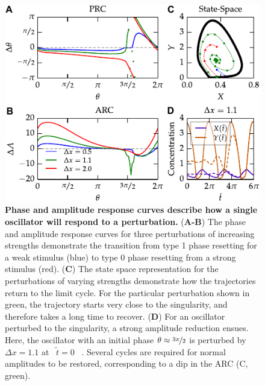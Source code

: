 \documentclass[11pt, letterpaper]{article}
\providecommand{\DIFadd}[1]{{\protect\color{blue}#1}} %
\providecommand{\DIFaddFL}[1]{\DIFadd{#1}} %
\providecommand{\DIFaddbeginFL}{} %
\providecommand{\DIFaddendFL}{} %
\begin{document}
\begin{figure}[tbp]
  \begin{center}
    \DIFaddbeginFL \includegraphics[width=.75\textwidth]{figures/figure_2.pdf}
    \DIFaddendFL \caption{
{\bfseries \DIFaddbeginFL \DIFaddFL{Phase }\DIFaddendFL and amplitude response curves \DIFaddbeginFL \DIFaddFL{describe }\DIFaddendFL how a single oscillator will respond to a perturbation.\DIFaddbeginFL }  \DIFaddendFL ({\bfseries A-B}) The phase and amplitude response curves for three perturbations of increasing strengths demonstrate the transition from type 1 phase resetting for a weak stimulus (blue) to type 0 phase resetting from a strong stimulus (red).
({\bfseries C}) The state space representation for the perturbations of varying strengths demonstrate how the trajectories return to the limit cycle.
For the particular perturbation shown in green, the trajectory starts very close to the singularity, and therefore takes a long time to recover.
({\bfseries D}) For an oscillator perturbed to the singularity, a strong amplitude reduction ensues.
Here, the oscillator with an initial phase $\theta \approx \nicefrac{3\pi}{2}$ is perturbed by $\Delta x = 1.1$ at \DIFaddbeginFL \DIFaddFL{\mbox{%
$\tilde{t} = 0$
}%
}\DIFaddendFL .
Several cycles are required for normal amplitudes to be restored, corresponding to a dip in the ARC (C, green).}
  \end{center}
\end{figure}
\end{document}
